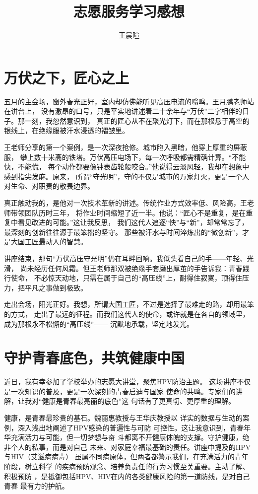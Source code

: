 \documentclass[11pt,a4paper]{ctexart}
\title{志愿服务学习感想}
\author{王晨暄}
\date{}
\begin{document}
\maketitle

\section{万伏之下，匠心之上}

五月的主会场，窗外春光正好，室内却仿佛能听见高压电流的嗡鸣。王月鹏老师站在讲台上，
没有激昂的口号，只是平实地讲述着二十余年与“万伏”二字相伴的日子。那一刻，我忽然意识到，
真正的匠心从不在聚光灯下，而在那根悬于高空的银线上，在绝缘服被汗水浸透的褶皱里。

王老师分享的第一个案例，是一次深夜抢修。城市陷入黑暗，他穿上厚重的屏蔽服，
攀上数十米高的铁塔。万伏高压电场下，每一次呼吸都需精确计算。“不能快，不能慌，
每个动作都要像钟表齿轮般咬合。”他说得云淡风轻，我却在想象中感到指尖发麻。原来，
所谓“守光明”，守的不仅是城市的万家灯火，更是一个人对生命、对职责的敬畏边界。

真正触动我的，是他对一次技术革新的讲述。传统作业方式效率低、风险高，王老师带领团队历时三年，
将作业时间缩短了近一半。他说：“匠心不是重复，是在重复中看见改进的可能。”这让我反思，
我们这代人追逐“快”与“新”，却常常忘了，最深刻的创新往往源于最笨拙的坚守。
那些被汗水与时间淬炼出的“微创新”，才是大国工匠最动人的智慧。

讲座结束，那句“万伏高压守光明”仍在耳畔回响。我低头看自己的手——年轻、光滑，
尚未经历任何风霜。但王老师那双被绝缘手套磨出厚茧的手告诉我：青春践行使命，
不必惊天动地，只需在属于自己的“高压线”上，耐得住寂寞，顶得住压力，把平凡之事做到极致。

走出会场，阳光正好。我想，所谓大国工匠，不过是选择了最难走的路，却用最笨的方式，
走出了最远的征程。而我们这代人的使命，或许就是在各自的领域里，成为那根永不松懈的“高压线”——
沉默地承载，坚定地发光。


\section{守护青春底色，共筑健康中国}

近日，我有幸参加了学校举办的志愿大讲堂，聚焦HPV防治主题。
这场讲座不仅是一次知识的普及，更是一次深刻的青春启迪与国家
使命的共鸣。专家们的讲解，让我对“健康是青春最亮丽的底色”这
句话有了更真切、更厚重的理解。

健康，是青春最珍贵的基石。魏丽惠教授与王华庆教授以
详实的数据与生动的案例，深入浅出地阐述了HPV感染的普遍性与可防
可控性。这让我意识到，青春年华充满活力与可能，但一切梦想与奋
斗都离不开健康体魄的支撑。守护健康，绝非个人的私事，而是对自己
未来、对家庭幸福最基础的责任。讲座中提及的HPV与HIV（艾滋病病毒）
虽属不同病原体，但两者都警示我们，在充满活力的青年阶段，树立科学
的疾病预防观念、培养负责任的行为习惯至关重要。主动了解、积极预防
，是抵御包括HPV、HIV在内的各类健康风险的第一道防线，是对自己青春
最有力的护航。
\end{document}
